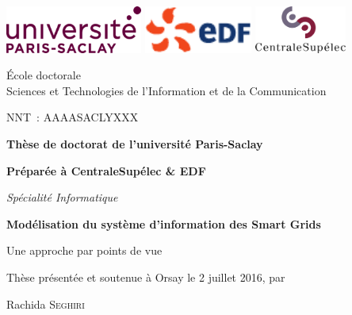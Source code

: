 \begin{titlepage}
\vspace*{-2cm}
\includegraphics[height=1.55cm]{logo/ParisSaclay}\hfill
\includegraphics[height=1.55cm]{logo/Logo_EDF}\hfill
\includegraphics[height=1.55cm]{logo/CentraleSupelec}

\hrulefill

\begin{minipage}[t]{0.6\textwidth}
    {\small
        École doctorale \\
        Sciences et Technologies de l'Information et de la Communication\\
    }
\end{minipage}
\hfill
\begin{minipage}[t]{0.3\textwidth}
    NNT~: AAAASACLYXXX
\end{minipage}

\bigskip
\bigskip

\begin{center}
{\large\bfseries Thèse de doctorat de l'université Paris-Saclay}

{\large\bfseries Préparée à CentraleSupélec \& EDF}

{\large \textit{Spécialité Informatique}}

\vfill

{\LARGE\bfseries
    Modélisation du système d'information des Smart Grids
    
    Une approche par points de vue
}

\vfill

{\large Thèse présentée et soutenue à Orsay le 2 juillet 2016, par}


\bigskip

{\Large Rachida \textsc{Seghiri}}

\end{center}
\vfill


\end{titlepage}

